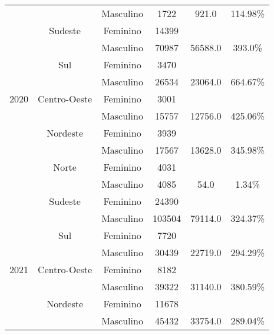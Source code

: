\begin{table}[htbp]
\begin{center}
\begin{tabular}{|c|c|c|c|c|c|}
			             &                  & Masculino     & 1722           & 921.0        & 114.98\%       \\
			             & Sudeste          & Feminino      & 14399          &              &                \\
			             &                  & Masculino     & 70987          & 56588.0      & 393.0\%        \\
			             & Sul              & Feminino      & 3470           &              &                \\
			             &                  & Masculino     & 26534          & 23064.0      & 664.67\%       \\\hline
			2020         & Centro-Oeste     & Feminino      & 3001           &              &                \\
			             &                  & Masculino     & 15757          & 12756.0      & 425.06\%       \\
			             & Nordeste         & Feminino      & 3939           &              &                \\
			             &                  & Masculino     & 17567          & 13628.0      & 345.98\%       \\
			             & Norte            & Feminino      & 4031           &              &                \\
			             &                  & Masculino     & 4085           & 54.0         & 1.34\%         \\
			             & Sudeste          & Feminino      & 24390          &              &                \\
			             &                  & Masculino     & 103504         & 79114.0      & 324.37\%       \\
			             & Sul              & Feminino      & 7720           &              &                \\
			             &                  & Masculino     & 30439          & 22719.0      & 294.29\%       \\\hline
			2021         & Centro-Oeste     & Feminino      & 8182           &              &                \\
			             &                  & Masculino     & 39322          & 31140.0      & 380.59\%       \\
			             & Nordeste         & Feminino      & 11678          &              &                \\
			             &                  & Masculino     & 45432          & 33754.0      & 289.04\%       \\

\end{tabular}
\end{center}
\end{table}
